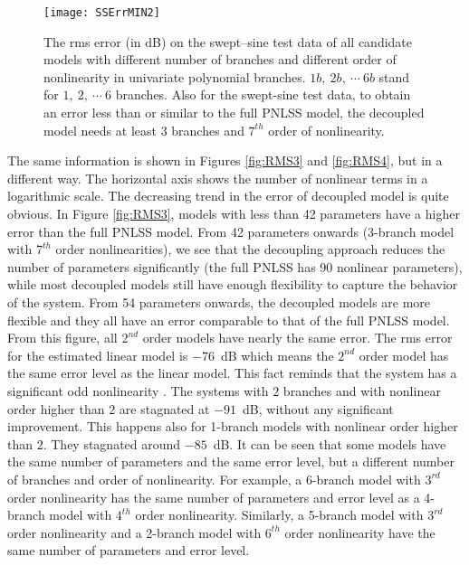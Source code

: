 \documentclass[review]{elsarticle}
\begin{document}
\begin{figure}[ht]
\begin{center}
\texttt{[image: SSErrMIN2]}    %
\caption{The rms error (in dB) on the swept--sine test data of all candidate models with different number of branches and different order of nonlinearity in univariate polynomial branches. $1b,\ 2b, \ \cdots \ 6b$ stand for $1, \ 2, \ \cdots \ 6$ branches.
Also for the swept-sine test data, to obtain an error less than or similar to the full PNLSS model, the decoupled model needs at least 3 branches and $7^{th}$ order of nonlinearity.} 
\label{fig:RMS2}
\end{center}
\end{figure}
The same information is shown in Figures \ref{fig:RMS3} and \ref{fig:RMS4}, but in a different way. The horizontal axis shows the number of nonlinear terms in a logarithmic scale. The decreasing trend in the error of decoupled model is quite obvious.
In Figure \ref{fig:RMS3}, models with less than 42 parameters have a higher error than the full PNLSS model. From 42 parameters onwards (3-branch model with $7^{th}$ order nonlinearities), we see that the decoupling approach reduces the number of parameters significantly (the full PNLSS has 90 nonlinear parameters), while most decoupled models still have enough flexibility to capture the behavior of the system. From 54 parameters onwards, the decoupled models are more flexible and they all have an error comparable to that of the full PNLSS model.
From this figure, all $2^{nd}$ order models have nearly the same error. The rms error for the estimated linear model is $-76$~dB which means the $2^{nd}$ order model has the same error level as the linear model. This fact reminds that the system has a significant odd nonlinearity \citep{Noel}. The systems with $2$ branches and with nonlinear order higher than $2$ are stagnated at $-91$~dB, without any significant improvement. This happens also for 1-branch models with nonlinear order higher than $2$. They stagnated around $-85$~dB. It can be seen that some models have the same number of parameters and the same error level, but a different number of branches and order of nonlinearity. For example, a 6-branch model with $3^{rd}$ order nonlinearity has the same number of parameters and error level as a 4-branch model with $4^{th}$ order nonlinearity. Similarly, a 5-branch model with $3^{rd}$ order nonlinearity and a 2-branch model with $6^{th}$ order nonlinearity have the same number of parameters and error level.
\end{document}
